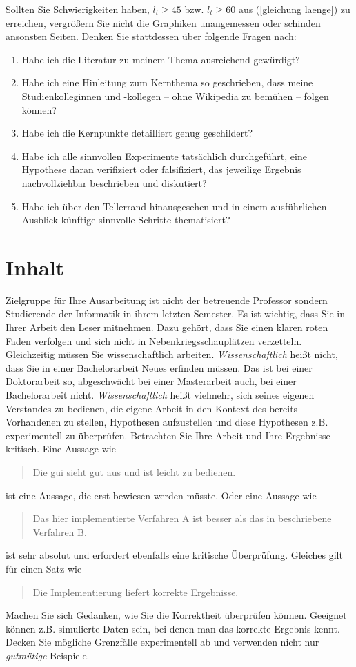 Sollten Sie Schwierigkeiten haben, $l_t \ge 45$ bzw. $l_t \ge 60$ aus (\ref{gleichung laenge}) zu erreichen, vergrößern Sie nicht die Graphiken unangemessen oder schinden ansonsten Seiten.
Denken Sie stattdessen über folgende Fragen nach:
\begin{enumerate}
\item Habe ich die Literatur zu meinem Thema ausreichend gewürdigt?
\item Habe ich eine Hinleitung zum Kernthema so geschrieben, dass meine Studienkolleginnen und -kollegen -- ohne Wikipedia zu bemühen -- folgen können?
\item Habe ich die Kernpunkte detailliert genug geschildert?
\item Habe ich alle sinnvollen Experimente tatsächlich durchgeführt, eine Hypothese daran verifiziert oder falsifiziert, das jeweilige Ergebnis nachvollziehbar beschrieben und diskutiert?
\item Habe ich über den Tellerrand hinausgesehen und in einem ausführlichen Ausblick künftige sinnvolle Schritte thematisiert?
\end{enumerate}

\section{Inhalt}
\label{inhalt}

Zielgruppe für Ihre Ausarbeitung ist nicht der betreuende Professor sondern Studierende der Informatik in ihrem letzten Semester.
Es ist wichtig, dass Sie in Ihrer Arbeit den Leser mitnehmen.
Dazu gehört, dass Sie einen klaren roten Faden verfolgen und sich nicht in Nebenkriegsschauplätzen verzetteln.
Gleichzeitig müssen Sie wissenschaftlich arbeiten.
\emph{Wissenschaftlich} heißt nicht, dass Sie in einer Bachelorarbeit Neues erfinden müssen.
Das ist bei einer Doktorarbeit so, abgeschwächt bei einer Masterarbeit auch, bei einer Bachelorarbeit nicht.
\emph{Wissenschaftlich} heißt vielmehr, sich seines eigenen Verstandes zu bedienen, die eigene Arbeit in den Kontext des bereits Vorhandenen zu stellen, Hypothesen aufzustellen und diese Hypothesen z.B. experimentell zu überprüfen.
Betrachten Sie Ihre Arbeit und Ihre Ergebnisse kritisch. Eine Aussage wie
\begin{quote}
\glqq Die \acs{gui} sieht gut aus und ist leicht zu bedienen\grqq.
\end{quote}
ist eine Aussage, die erst bewiesen werden müsste. Oder eine Aussage wie
\begin{quote}
\glqq Das hier implementierte Verfahren A ist besser als das in \cite{palm2004color} beschriebene Verfahren B\grqq.
\end{quote}
ist sehr absolut und erfordert ebenfalls eine kritische Überprüfung. Gleiches gilt für einen Satz wie
\begin{quote}
\glqq Die Implementierung liefert korrekte Ergebnisse\grqq.
\end{quote}
Machen Sie sich Gedanken, wie Sie die Korrektheit überprüfen können.
Geeignet können z.B. simulierte Daten sein, bei denen man das korrekte Ergebnis kennt.
Decken Sie mögliche Grenzfälle experimentell ab und verwenden nicht nur \emph{gutmütige} Beispiele.

